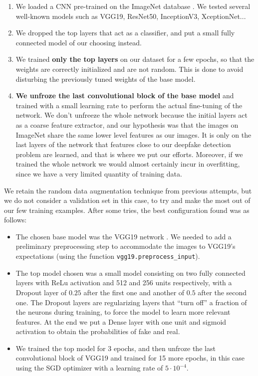 \documentclass[11pt]{article}
\begin{document}
\begin{enumerate}
  \item We loaded a CNN pre-trained on the ImageNet database \citep{deng2009imagenet}.  We tested several well-known models such as VGG19, ResNet50, InceptionV3, XceptionNet...
  \item We dropped the top layers that act as a classifier, and put a small fully connected model of our choosing instead.
  \item We trained \textbf{only the top layers} on our dataset for a few epochs, so that the weights are correctly initialized and are not random. This is done to avoid disturbing the previously tuned weights of the base model.
  \item \textbf{We unfroze the last convolutional block of the base model} and trained with a small learning rate to perform the actual fine-tuning of the network. We don't unfreeze the whole network because the initial layers act as a coarse feature extractor, and our hypothesis was that the images on ImageNet share the same lower level features as our images. It is only on the last layers of the network that features close to our deepfake detection problem are learned, and that is where we put our efforts. Moreover, if we trained the whole network we would almost certainly incur in overfitting, since we have a very limited quantity of training data.
\end{enumerate}

We retain the random data augmentation technique from previous attempts, but we do not consider a validation set in this case, to try and make the most out of our few training examples. After some tries, the best configuration found was as follows:

\begin{itemize}
  \item The chosen base model was the VGG19 network \citep{simonyan2015deep}. We needed to add a preliminary preprocessing step to accommodate the images to VGG19's expectations (using the function \texttt{vgg19.preprocess\_input}).
  \item The top model chosen was a small model consisting on two fully connected layers with ReLu activation and 512 and 256 units respectively, with a Dropout layer of $0.25$ after the first one and another of $0.5$ after the second one. The Dropout layers are regularizing layers that ``turn off'' a fraction of the neurons during training, to force the model to learn more relevant features. At the end we put a Dense layer with one unit and sigmoid activation to obtain the probabilities of fake and real.
  \item We trained the top model for 3 epochs, and then unfroze the last convolutional block of VGG19 and trained for 15 more epochs, in this case using the SGD optimizer with a learning rate of $5\cdot 10^{-4}$.
\end{itemize}
\end{document}
